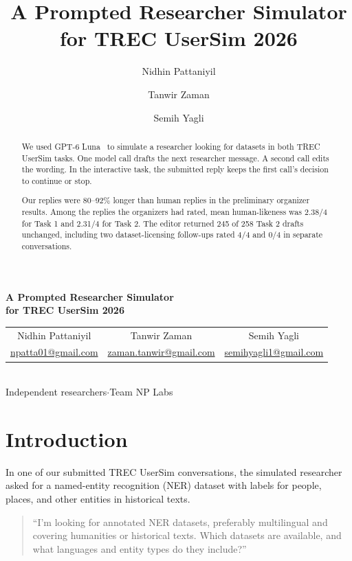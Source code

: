 \documentclass[11pt,letterpaper]{article}
\title{A Prompted Researcher Simulator for TREC UserSim 2026}
\author{Nidhin Pattaniyil \and Tanwir Zaman \and Semih Yagli}\date{}
\begin{document}
\begin{center}
{\Large\bfseries A Prompted Researcher Simulator\\[3pt]for TREC UserSim 2026}\par
\vspace{3pt}
{\setlength{\tabcolsep}{9pt}\begin{tabular}{@{}ccc@{}}
Nidhin Pattaniyil & Tanwir Zaman & Semih Yagli\\[2pt]
\footnotesize\href{mailto:npatta01@gmail.com}{npatta01@gmail.com} &
\footnotesize\href{mailto:zaman.tanwir@gmail.com}{zaman.tanwir@gmail.com} &
\footnotesize\href{mailto:semihyagli1@gmail.com}{semihyagli1@gmail.com}
\end{tabular}}\\[4pt]
{\small Independent researchers\enspace$\cdot$\enspace Team NP Labs}
\end{center}
\begin{abstract}
We used GPT-6 Luna~\cite{luna} to simulate a researcher looking for datasets in both TREC UserSim tasks. One model call drafts the next researcher message. A second call edits the wording. In the interactive task, the submitted reply keeps the first call's decision to continue or stop.

\par\smallskip\noindent
Our replies were 80--92\% longer than human replies in the preliminary organizer results. Among the replies the organizers had rated, mean human-likeness was 2.38/4 for Task 1 and 2.31/4 for Task 2. The editor returned 245 of 258 Task 2 drafts unchanged, including two dataset-licensing follow-ups rated 4/4 and 0/4 in separate conversations.
\end{abstract}

\section{Introduction}\label{sec:intro}

In one of our submitted TREC UserSim conversations, the simulated researcher asked for a named-entity recognition (NER) dataset with labels for people, places, and other entities in historical texts.

\begin{quote}
“I’m looking for annotated NER datasets, preferably multilingual and covering humanities or historical texts. Which datasets are available, and what languages and entity types do they include?”
\end{quote}
\end{document}
